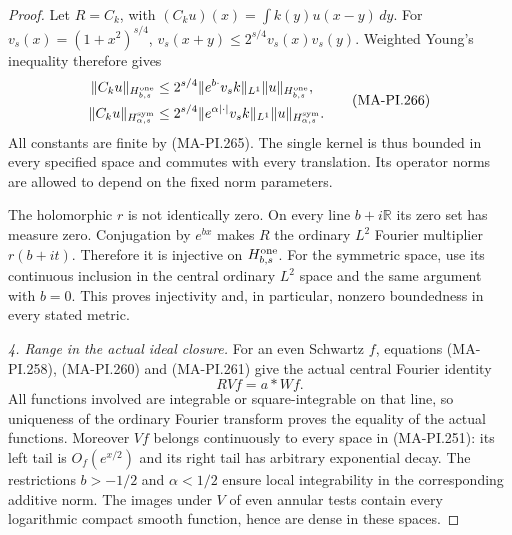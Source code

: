\begin{proof}
Let \(R=C_k\), with
\((C_k u)(x)=\int k(y)u(x-y)\,dy\).
For \(v_s(x)=(1+x^2)^{s/4}\),
\(v_s(x+y)\le2^{s/4}v_s(x)v_s(y)\).
Weighted Young's inequality therefore gives
\[
 \begin{aligned}
 \|C_k u\|_{H^{\rm one}_{b,s}}
   &\le2^{s/4}\|e^{b\cdot}v_s k\|_{L^1}
                                         \|u\|_{H^{\rm one}_{b,s}},\\
 \|C_k u\|_{H^{\rm sym}_{\alpha,s}}
   &\le2^{s/4}\|e^{\alpha|\cdot|}v_s k\|_{L^1}
                                         \|u\|_{H^{\rm sym}_{\alpha,s}}.
 \end{aligned}
 \tag{MA-PI.266}
\]
All constants are finite by (MA-PI.265).  The single
kernel is thus bounded in every specified space and
commutes with every translation.  Its operator norms
are allowed to depend on the fixed norm parameters.

The holomorphic \(r\) is not identically zero.  On every
line \(b+i\mathbb R\) its zero set has measure zero.
Conjugation by \(e^{bx}\) makes \(R\) the ordinary
\(L^2\) Fourier multiplier \(r(b+it)\).  Therefore it
is injective on \(H^{\rm one}_{b,s}\).
For the symmetric space, use its continuous inclusion
in the central ordinary \(L^2\) space and the same
argument with \(b=0\).  This proves injectivity and,
in particular, nonzero boundedness in every stated metric.

\emph{4. Range in the actual ideal closure.}
For an even Schwartz \(f\), equations
(MA-PI.258), (MA-PI.260) and (MA-PI.261) give the actual
central Fourier identity
\[
                         RVf=a*Wf.
 \tag{MA-PI.267}
\]
All functions involved are integrable or square-integrable
on that line, so uniqueness of the ordinary Fourier
transform proves the equality of the actual functions.
Moreover \(Vf\) belongs continuously to every space in
(MA-PI.251): its left tail is \(O_f(e^{x/2})\) and its
right tail has arbitrary exponential decay.  The restrictions
\(b>-1/2\) and \(\alpha<1/2\) ensure local integrability
in the corresponding additive norm.  The images under
\(V\) of even annular tests contain every logarithmic
compact smooth function, hence are dense in these spaces.


\end{proof}
